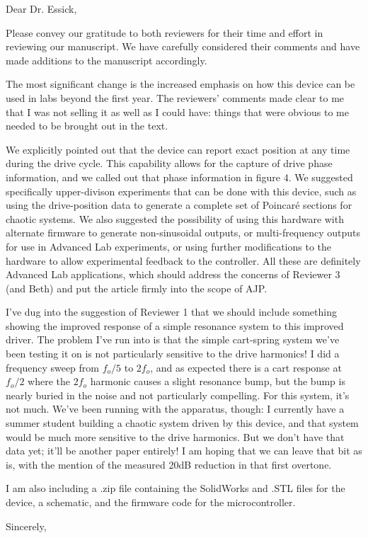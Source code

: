 \documentclass[12pt]{letter}
\begin{document}
\signature{Dr. Eric Ayars \\ Professor of Physics \\ CSU Chico Department of Physics}

\begin{letter}{}
	
\opening{Dear Dr. Essick,}

Please convey our gratitude to both reviewers for their time and effort in reviewing our manuscript.
We have carefully considered their comments and have made additions to the manuscript accordingly.

The most significant change is the increased emphasis on how this device can be used in labs beyond the first year. 
The reviewers' comments made clear to me that I was not selling it as well as I could have: things that were obvious to me needed to be brought out in the text.

We explicitly pointed out that the device can report exact position at any time during the drive cycle. 
This capability allows for the capture of drive phase information, and we called out that phase information in figure 4.
We suggested specifically upper-divison experiments that can be done with this device, such as using the drive-position data to generate a complete set of Poincar\'e sections for chaotic systems.
We also suggested the possibility of using this hardware with alternate firmware to generate non-sinusoidal outputs, or multi-frequency outputs for use in Advanced Lab experiments, or using further modifications to the hardware to allow experimental feedback to the controller. 
All these are definitely Advanced Lab applications, which should address the concerns of Reviewer 3 (and Beth) and put the article firmly into the scope of AJP.

I've dug into the suggestion of Reviewer 1 that we should include something showing the improved response of a simple resonance system to this improved driver. 
The problem I've run into is that the simple cart-spring system we've been testing it on is not particularly sensitive to the drive harmonics! 
I did a frequency sweep from $f_o/5$ to $2f_o$, and as expected there is a cart response at $f_o/2$ where the $2f_o$ harmonic causes a slight resonance bump, but the bump is nearly buried in the noise and not particularly compelling. 
For this system, it's not much. 
We've been running with the apparatus, though: I currently have a  summer student building a chaotic system driven by this device, and that system would be much more sensitive to the drive harmonics.
But we don't have that data yet; it'll be another paper entirely!
I am hoping that we can leave that bit as is, with the mention of the measured 20dB reduction in that first overtone.

I am also including a .zip file containing the SolidWorks and .STL files for the device, a schematic, and the firmware code for the microcontroller.

\closing{Sincerely,}

\end{letter}
\end{document}

